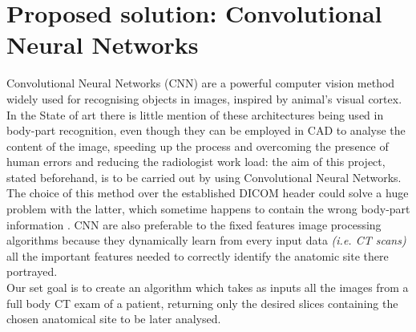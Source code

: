 \documentclass[../main.tex]{subfiles}
\begin{document}
\section{Proposed solution: Convolutional Neural Networks}
Convolutional Neural Networks (CNN) are  a powerful computer vision method widely used for recognising objects in images, inspired by animal's visual cortex. In the State of art there is little mention of these architectures being used in body-part recognition\cite{Wang}, even though they can be employed in CAD to analyse the content of the image, speeding up the process and overcoming the presence of human errors and reducing the radiologist work load: the aim of this project, stated beforehand, is to be carried out by using Convolutional Neural Networks. The choice of this method over the established DICOM header could solve a huge problem with the latter, which sometime happens to contain the wrong body-part information \cite{Yan2016}. CNN are also preferable to the fixed features image processing algorithms because they dynamically learn from every input data \textit{(i.e. CT scans)} all the important features needed to correctly identify the anatomic site there portrayed. \\ 
Our set goal is to create an algorithm which takes as inputs all the images from a full body CT exam of a patient, returning only the desired slices containing the chosen anatomical site to be later analysed. \\ 

\end{document}
